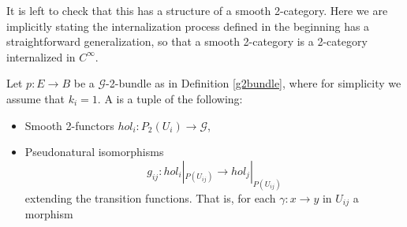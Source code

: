 It is left to check that this has a structure of a smooth 2-category. Here we are implicitly stating the internalization process defined in the beginning has a straightforward generalization, so that a smooth 2-category is a 2-category internalized in $C^\infty$.

\begin{definition}
 Let $p:E\rightarrow B$ be a $\mathcal{G}$-2-bundle as in Definition \ref{g2bundle}, where for simplicity we assume that $k_i=1$. A  is a tuple of the following:
\begin{itemize}
 \item Smooth 2-functors $hol_i:P_2(U_i)\rightarrow \mathcal{G}$,
\item Pseudonatural isomorphisms \[
                           g_{ij}:hol_i|_{P(U_{ij})}\rightarrow hol_j|_{P(U_{ij})}
                          \]
extending the transition functions. That is, for each $\gamma:x\rightarrow y$ in $U_{ij}$ a morphism


\end{itemize}
\end{definition}
